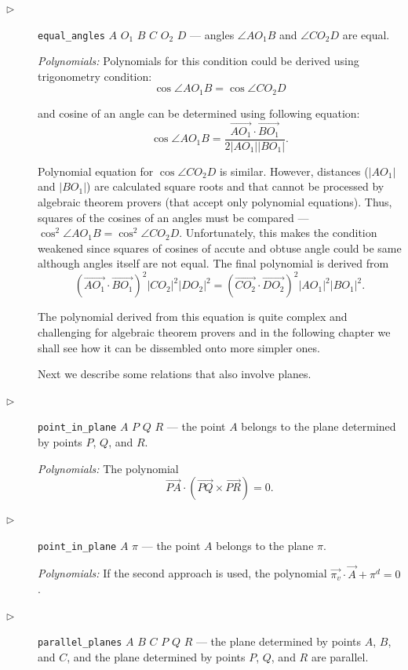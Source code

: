 \documentclass[final,1p,times,authoryear]{elsarticle}
\begin{document}
\begin{description}
\item[$\triangleright$] {\tt equal\_angles} $A$ $O_1$ $B$ $C$ $O_2$ $D$ --- angles $\angle AO_1B$ and $\angle
CO_2D$ are equal.

{\em Polynomials:} Polynomials for this condition could be derived
using trigonometry condition:
$$\cos{\angle AO_1B} = \cos{\angle CO_2D}$$

and cosine of an angle can be determined using following equation:
$$\cos{\angle AO_1B} = \frac{\overrightarrow{AO_1}\cdot
  \overrightarrow{BO_1}}{2|AO_1||BO_1|}.$$

Polynomial equation for $\cos{\angle CO_2D}$ is similar. However,
distances ($|AO_1|$ and $|BO_1|$) are calculated square roots and that
cannot be processed by algebraic theorem provers (that accept only
polynomial equations). Thus, squares of the cosines of an angles must
be compared --- $\cos^2{\angle AO_1B} = \cos^2{\angle CO_2D}$.
Unfortunately, this makes the condition weakened since squares of
cosines of accute and obtuse angle could be same although angles
itself are not equal. The final polynomial is derived from
$$(\overrightarrow{AO_1}\cdot  \overrightarrow{BO_1})^2|CO_2|^2|DO_2|^2 = (\overrightarrow{CO_2}\cdot  \overrightarrow{DO_2})^2|AO_1|^2|BO_1|^2.$$

The polynomial derived from this equation is quite complex and
challenging for algebraic theorem provers and in the following chapter
we shall see how it can be dissembled onto more simpler ones.

\bigskip

Next we describe some relations that also involve planes.

\item[$\triangleright$] {\tt point\_in\_plane} $A$ $P$ $Q$ $R$
  --- the point $A$ belongs to the plane determined by points $P$,
  $Q$, and $R$.

  {\em Polynomials:} The polynomial
$$\overrightarrow{PA}\cdot (\overrightarrow{PQ} \times \overrightarrow{PR}) = 0.$$

\item[$\triangleright$] {\tt point\_in\_plane} $A$ $\pi$ --- the
  point $A$ belongs to the plane $\pi$.

  {\em Polynomials:} If the second approach is used, the polynomial
  $\overrightarrow{\pi_v} \cdot \overrightarrow{A} + \pi^{d} = 0$.

\item[$\triangleright$] {\tt parallel\_planes} $A$ $B$ $C$ $P$ $Q$ $R$
  --- the plane determined by points $A$, $B$, and $C$, and the plane
  determined by points $P$, $Q$, and $R$ are parallel.


\end{description}
\end{document}
